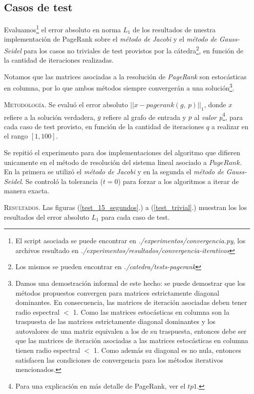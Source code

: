 \subsection{Casos de test}

Evaluamos\footnote{El script asociada se puede encontrar en \textit{./experimentos/convergencia.py}, los archivos resultado en \textit{./experimentos/resultados/convergencia-iterativos}} el error absoluto en norma $L_1$ de los resultados de nuestra implementación de PageRank sobre el \textit{método de Jacobi} y el \textit{método de Gauss-Seidel} para los casos no triviales de test provistos por la cátedra\footnote{Los mismos se pueden encontrar en \textit{./catedra/tests-pagerank}}, en función de la cantidad de iteraciones realizadas.

Notamos que las matrices asociadas a la resolución de \textit{PageRank} son estocásticas en columna, por lo que ambos métodos siempre convergerán a una solución\footnote{Damos una demostración informal de este hecho: se puede demostrar que los métodos propuestos convergen para matrices estrictamente diagonal dominantes. En consecuencia, las matrices de iteración asociadas deben tener radio espectral $<$ 1. Como las matrices estocásticas en columna son la traspuesta de las matrices estrictamente diagonal dominantes y los autovalores de una matriz equivalen a los de su traspuesta, entonces debe ser que las matrices de iteración asociadas a las matrices estocásticas en columna tienen radio espectral $<$ 1. Como además su diagonal es no nula, entonces satisfacen las condiciones de convergencia para los métodos iterativos mencionados.}. 

\vspace{2em}
\noindent\textsc{Metodología}. Se evaluó el error absoluto $||x - pagerank(g,\ p)||_1$, donde $x$ refiere a la solución verdadera, $g$ refiere al grafo de entrada y $p$ al \textit{valor p}\footnote{Para una explicación en más detalle de PageRank, ver el $tp1$.}, para cada caso de test provisto, en función de la cantidad de iteraciones $q$ a realizar en el rango $[1, 100]$.

Se repitió el experimento para dos implementaciones del algoritmo que difieren unicamente en el método de resolución del sistema lineal asociado a $PageRank$. En la primera se utilizó el \textit{método de Jacobi} y en la segunda el \textit{método de Gauss-Seidel}. Se controló la tolerancia ($t = 0$) para forzar a los algoritmos a iterar de manera exacta. 

\vspace{2em}
\noindent\textsc{Resultados}. Las figuras (\ref{test_15_segundos}.) a (\ref{test_trivial}.) muestran los los resultados del error absoluto $L_1$ para cada caso de test.

